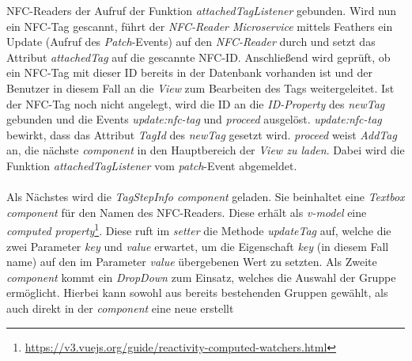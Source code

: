 \documentclass[10pt, a4paper]{article}
\begin{document}
NFC-Readers der Aufruf der Funktion \textit{attachedTagListener} gebunden. Wird nun ein NFC-Tag gescannt, führt der \textit{NFC-Reader Microservice} mittels Feathers ein Update (Aufruf des \textit{Patch}-Events) auf den \textit{NFC-Reader} durch und setzt das Attribut \textit{attachedTag} auf die gescannte NFC-ID.
Anschließend wird geprüft, ob ein NFC-Tag mit dieser ID bereits in der Datenbank vorhanden ist und der Benutzer in diesem Fall an die \textit{View} zum Bearbeiten des Tags weitergeleitet.
Ist der NFC-Tag noch nicht angelegt, wird die ID an die \textit{ID-Property} des \textit{newTag} gebunden und die Events \textit{update:nfc-tag} und \textit{proceed} ausgelöst.
\textit{update:nfc-tag} bewirkt, dass das Attribut \textit{TagId} des \textit{newTag} gesetzt wird.
\textit{proceed} weist \textit{AddTag} an, die nächste \textit{component} in den Hauptbereich der \textit{View zu laden}.
Dabei wird die Funktion \textit{attachedTagListener} vom \textit{patch}-Event abgemeldet.
\\~\\
Als Nächstes wird die \textit{TagStepInfo component} geladen.
Sie beinhaltet eine \textit{Textbox component} für den Namen des NFC-Readers.
Diese erhält als \textit{v-model} eine \textit{computed property}\footnote{\url{https://v3.vuejs.org/guide/reactivity-computed-watchers.html}}.
Diese ruft im \textit{setter} die Methode \textit{updateTag} auf, welche die zwei Parameter \textit{key} und \textit{value} erwartet, um die Eigenschaft \textit{key} (in diesem Fall \glqq name\grqq{}) auf den im Parameter \textit{value} übergebenen Wert zu setzten.
Als Zweite \textit{component} kommt ein \textit{DropDown} zum Einsatz,
welches die Auswahl der Gruppe ermöglicht. Hierbei kann sowohl aus bereits bestehenden Gruppen gewählt, als auch direkt in der \textit{component} eine neue erstellt
\end{document}

